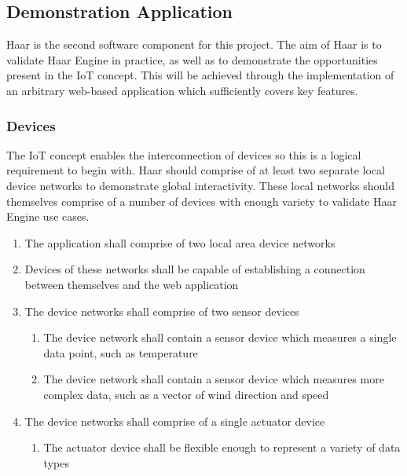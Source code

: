     \subsection{Demonstration Application}
    \label{section:demonstration-application-spec}
      Haar is the second software component for this project. The aim of Haar is to validate Haar Engine in practice, as well as to demonstrate the opportunities present in the IoT concept. This will be achieved through the implementation of an arbitrary web-based application which sufficiently covers key features.

      \subsubsection{Devices}
        The IoT concept enables the interconnection of devices so this is a logical requirement to begin with. Haar should comprise of at least two separate local device networks to demonstrate global interactivity. These local networks should themselves comprise of a number of devices with enough variety to validate Haar Engine use cases.

        \begin{enumerate}
          \item The application shall comprise of two local area device networks
          \item Devices of these networks shall be capable of establishing a connection between themselves and the web application
          \item The device networks shall comprise of two sensor devices
          \begin{enumerate}
            \item The device network shall contain a sensor device which measures a single data point, such as temperature
            \item The device network shall contain a sensor device which measures more complex data, such as a vector of wind direction and speed 
          \end{enumerate}
          \item The device networks shall comprise of a single actuator device
          \begin{enumerate}
            \item The actuator device shall be flexible enough to represent a variety of data types
          \end{enumerate} 
        \end{enumerate}

